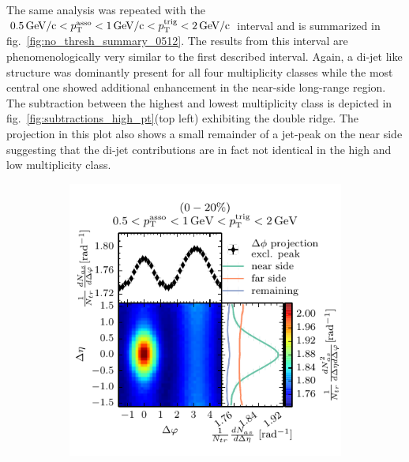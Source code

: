The same analysis was repeated with the $\SI{0.5}{GeV/c} < p_{\text{T}}^{\text{asso}} < \SI{1}{GeV/c} < p_{\text{T}}^{\text{trig}} < \SI{2}{GeV/c}$ interval and is summarized in fig.~\ref{fig:no_thresh_summary_0512}. The results from this interval are phenomenologically very similar to the first described interval. Again, a di-jet like structure was dominantly present for all four multiplicity classes while the most central one showed additional enhancement in the near-side long-range region. The subtraction between the highest and lowest multiplicity class is depicted in fig.~\ref{fig:subtractions_high_pt}(top left) exhibiting the double ridge. The \deta projection in this plot also shows a small remainder of a jet-peak on the near side suggesting that the di-jet contributions are in fact not identical in the high and low multiplicity class.

\begin{figure}
  \centering
  \begin{subfigure}[b]{0.5\textwidth}
    \includegraphics[]{figures/051_12_class0.pdf}
  \end{subfigure}%
  \begin{subfigure}[b]{0.5\textwidth}

\end{subfigure}
\end{figure}
